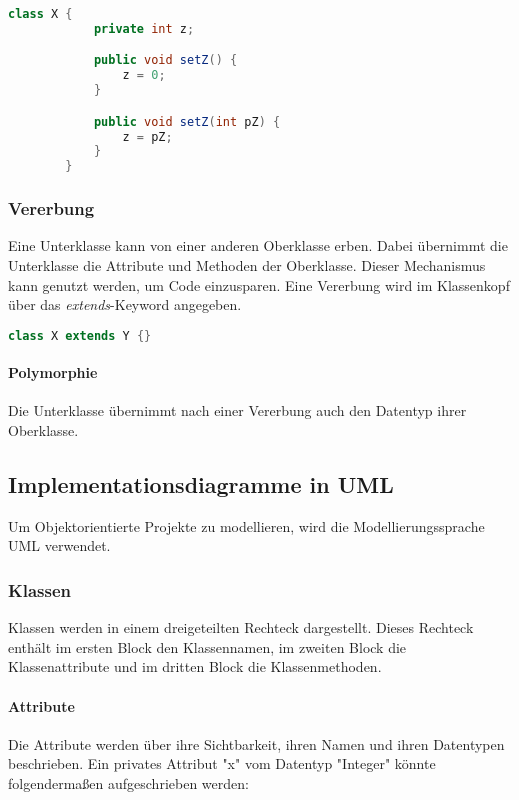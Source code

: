 \documentclass{article}
\begin{document}
	\begin{lstlisting}[language=Java, caption=Ein Beispiel für Überladung]
		class X {
			private int z;

			public void setZ() {
				z = 0;
			}

			public void setZ(int pZ) {
				z = pZ;
			}
		}
	\end{lstlisting}

	\newpage

	\subsubsection{Vererbung}
	Eine Unterklasse kann von einer anderen Oberklasse erben. Dabei übernimmt die Unterklasse die Attribute und Methoden der Oberklasse. Dieser Mechanismus kann genutzt werden, um Code einzusparen. Eine Vererbung wird im Klassenkopf über das \textit{extends}-Keyword angegeben.

	\begin{lstlisting}[language=Java, caption=Vererbung im Klassenkopf]
		class X extends Y {}
	\end{lstlisting}

	\paragraph{Polymorphie}
	Die Unterklasse übernimmt nach einer Vererbung auch den Datentyp ihrer Oberklasse.

	\subsection{Implementationsdiagramme in UML}
	Um Objektorientierte Projekte zu modellieren, wird die Modellierungssprache UML verwendet.

	\subsubsection{Klassen}
	Klassen werden in einem dreigeteilten Rechteck dargestellt. Dieses Rechteck enthält im ersten Block den Klassennamen, im zweiten Block die Klassenattribute und im dritten Block die Klassenmethoden.

	\paragraph{Attribute}
	Die Attribute werden über ihre Sichtbarkeit, ihren Namen und ihren Datentypen beschrieben. Ein privates Attribut "x" vom Datentyp "Integer" könnte folgendermaßen aufgeschrieben werden:
\end{document}
